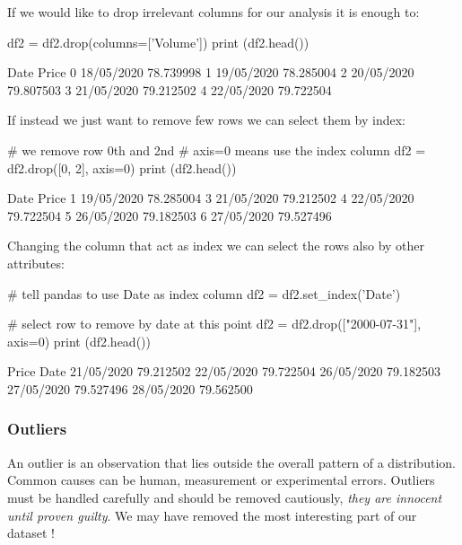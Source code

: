 If we would like to drop irrelevant columns for our analysis it is enough to:

\begin{ipython}
df2 = df2.drop(columns=['Volume'])
print (df2.head())
\end{ipython}
\begin{ioutput}
         Date      Price
0  18/05/2020  78.739998
1  19/05/2020  78.285004
2  20/05/2020  79.807503
3  21/05/2020  79.212502
4  22/05/2020  79.722504
\end{ioutput}
        
If instead we just want to remove few rows we can select them by index:

\begin{ipython}
# we remove row 0th and 2nd
# axis=0 means use the index column
df2 = df2.drop([0, 2], axis=0)
print (df2.head())
\end{ipython}
\begin{ioutput}
         Date      Price
1  19/05/2020  78.285004
3  21/05/2020  79.212502
4  22/05/2020  79.722504
5  26/05/2020  79.182503
6  27/05/2020  79.527496
\end{ioutput}
        
Changing the column that act as index we can select the rows also by other attributes:

\begin{ipython}
# tell pandas to use Date as index column
df2 = df2.set_index('Date')

# select row to remove by date at this point
df2 = df2.drop(["2000-07-31"], axis=0)
print (df2.head())
\end{ipython}
\begin{ioutput}
                Price
Date                 
21/05/2020  79.212502
22/05/2020  79.722504
26/05/2020  79.182503
27/05/2020  79.527496
28/05/2020  79.562500
\end{ioutput}
        
\subsubsection{Outliers}\label{outliers}

An outlier is an observation that lies outside the overall pattern of a distribution. Common causes can be human, measurement or experimental errors. Outliers must be handled carefully and should be removed cautiously, \emph{they are innocent until proven guilty}. We may have removed the most interesting part of our dataset !

